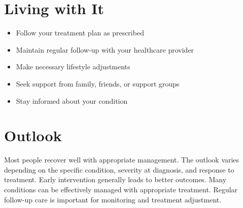 \section{Living with It}
\begin{itemize}[noitemsep]
  \item Follow your treatment plan as prescribed
  \item Maintain regular follow-up with your healthcare provider
  \item Make necessary lifestyle adjustments
  \item Seek support from family, friends, or support groups
  \item Stay informed about your condition
\end{itemize}
\section{Outlook}
Most people recover well with appropriate management. The outlook varies depending on the specific condition, severity at diagnosis, and response to treatment. Early intervention generally leads to better outcomes. Many conditions can be effectively managed with appropriate treatment. Regular follow-up care is important for monitoring and treatment adjustment.
